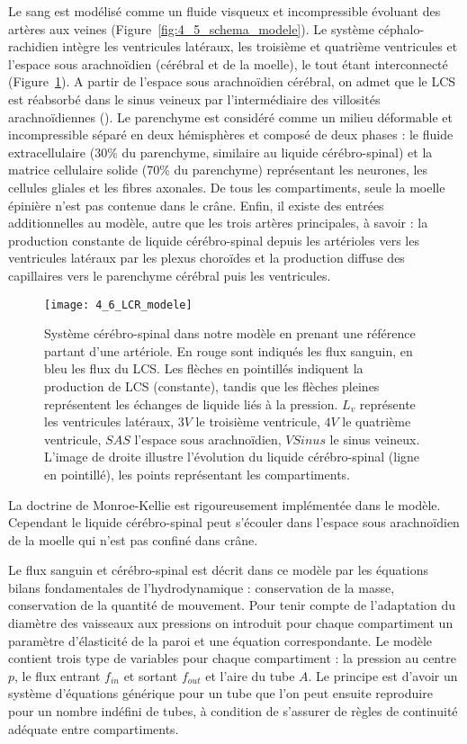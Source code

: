 Le sang est modélisé comme un fluide visqueux et incompressible évoluant des artères aux veines
(Figure~\ref{fig:4_5_schema_modele}). Le système céphalo-rachidien intègre les ventricules latéraux, les troisième et quatrième
ventricules et l’espace sous arachnoïdien (cérébral et de la moelle), le tout étant interconnecté (Figure~\ref{fig:4_6_LCR_modele}). A partir de l’espace sous arachnoïdien cérébral, on admet que le LCS est réabsorbé dans le sinus
veineux par l’intermédiaire des villosités arachnoïdiennes (\cite{Segal2001}). Le parenchyme est considéré comme
un milieu déformable et incompressible séparé en deux hémisphères et composé de deux phases : le
fluide extracellulaire (30\% du parenchyme, similaire au liquide cérébro-spinal) et la matrice cellulaire
solide (70\% du parenchyme) représentant les neurones, les cellules gliales et les fibres axonales. De
tous les compartiments, seule la moelle épinière n’est pas contenue dans le crâne. Enfin, il existe des
entrées additionnelles au modèle, autre que les trois artères principales, à savoir : la production constante de liquide cérébro-spinal depuis les artérioles vers les ventricules latéraux par les plexus
choroïdes et la production diffuse des capillaires vers le parenchyme cérébral puis les ventricules.

\begin{figure}[!t]
\centering
\texttt{[image: 4\_6\_LCR\_modele]}
\caption{Système cérébro-spinal dans notre modèle en prenant une référence partant d’une artériole. En rouge sont
indiqués les flux sanguin, en bleu les flux du LCS. Les flèches en pointillés indiquent la production de LCS (constante), tandis
que les flèches pleines représentent les échanges de liquide liés à la pression. $L_v$ représente les ventricules latéraux, $3V$ le
troisième ventricule, $4V$ le quatrième ventricule, $SAS$ l’espace sous arachnoïdien, $VSinus$ le sinus veineux. L’image de droite
illustre l’évolution du liquide cérébro-spinal (ligne en pointillé), les points représentant les compartiments.}
\label{fig:4_6_LCR_modele}	
\end{figure}
La doctrine de Monroe-Kellie est rigoureusement implémentée dans le modèle. Cependant le
liquide cérébro-spinal peut s’écouler dans l’espace sous arachnoïdien de la moelle qui n’est pas confiné
dans crâne.

Le flux sanguin et cérébro-spinal est décrit dans ce modèle par les équations bilans fondamentales
de l’hydrodynamique : conservation de la masse, conservation de la quantité de mouvement. Pour
tenir compte de l’adaptation du diamètre des vaisseaux aux pressions on introduit pour chaque
compartiment un paramètre d’élasticité de la paroi et une équation correspondante. Le modèle
contient trois type de variables pour chaque compartiment : la pression au centre $p$, le flux entrant $f_{in}$ 
et sortant $f_{out}$ et l’aire du tube $A$. Le principe est d’avoir un système d’équations générique pour un
tube que l’on peut ensuite reproduire pour un nombre indéfini de tubes, à condition de s’assurer de
règles de continuité adéquate entre compartiments.

